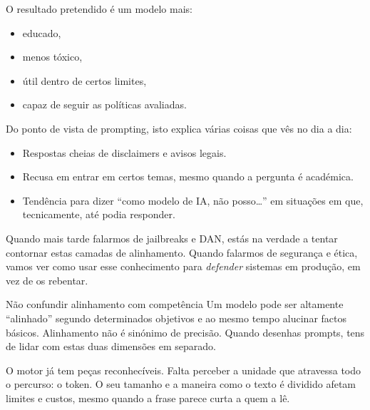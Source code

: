 O resultado pretendido é um modelo mais:

\begin{itemize}[leftmargin=*]
\item educado,
\item menos tóxico,
\item útil dentro de certos limites,
\item capaz de seguir as políticas avaliadas.
\end{itemize}

Do ponto de vista de prompting, isto explica várias coisas que vês no dia a dia:

\begin{itemize}[leftmargin=*]
\item Respostas cheias de disclaimers e avisos legais.
\item Recusa em entrar em certos temas, mesmo quando a pergunta é académica.
\item Tendência para dizer “como modelo de IA, não posso…” em situações em que, tecnicamente, até podia responder.
\end{itemize}

Quando mais tarde falarmos de jailbreaks e DAN, estás na verdade a tentar contornar estas camadas de alinhamento. Quando falarmos de segurança e ética, vamos ver como usar esse conhecimento para \emph{defender} sistemas em produção, em vez de os rebentar.

\begin{warningboxenv}{Não confundir alinhamento com competência}
Um modelo pode ser altamente “alinhado” segundo determinados objetivos e ao mesmo tempo alucinar factos básicos. Alinhamento não é sinónimo de precisão. Quando desenhas prompts, tens de lidar com estas duas dimensões em separado.
\end{warningboxenv}

O motor já tem peças reconhecíveis. Falta perceber a unidade que atravessa todo o percurso: o token. O seu tamanho e a maneira como o texto é dividido afetam limites e custos, mesmo quando a frase parece curta a quem a lê.

